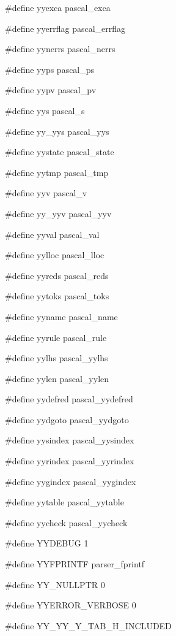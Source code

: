 \medskip
{\stt \#define yyexca pascal\_exca}

\medskip
{\stt \#define yyerrflag pascal\_errflag}

\medskip
{\stt \#define yynerrs pascal\_nerrs}

\medskip
{\stt \#define yyps pascal\_ps}

\medskip
{\stt \#define yypv pascal\_pv}

\medskip
{\stt \#define yys pascal\_s}

\medskip
{\stt \#define yy\_yys pascal\_yys}

\medskip
{\stt \#define yystate pascal\_state}

\medskip
{\stt \#define yytmp pascal\_tmp}

\medskip
{\stt \#define yyv pascal\_v}

\medskip
{\stt \#define yy\_yyv pascal\_yyv}

\medskip
{\stt \#define yyval pascal\_val}

\medskip
{\stt \#define yylloc pascal\_lloc}

\medskip
{\stt \#define yyreds pascal\_reds}

\medskip
{\stt \#define yytoks pascal\_toks}

\medskip
{\stt \#define yyname pascal\_name}

\medskip
{\stt \#define yyrule pascal\_rule}

\medskip
{\stt \#define yylhs pascal\_yylhs}

\medskip
{\stt \#define yylen pascal\_yylen}

\medskip
{\stt \#define yydefred pascal\_yydefred}

\medskip
{\stt \#define yydgoto pascal\_yydgoto}

\medskip
{\stt \#define yysindex pascal\_yysindex}

\medskip
{\stt \#define yyrindex pascal\_yyrindex}

\medskip
{\stt \#define yygindex pascal\_yygindex}

\medskip
{\stt \#define yytable pascal\_yytable}

\medskip
{\stt \#define yycheck pascal\_yycheck}

\medskip
{\stt \#define YYDEBUG 1}

\medskip
{\stt \#define YYFPRINTF parser\_fprintf}

\medskip
{\stt \#define YY\_NULLPTR 0}

\medskip
{\stt \#define YYERROR\_VERBOSE 0}

\medskip
{\stt \#define YY\_YY\_Y\_TAB\_H\_INCLUDED}

